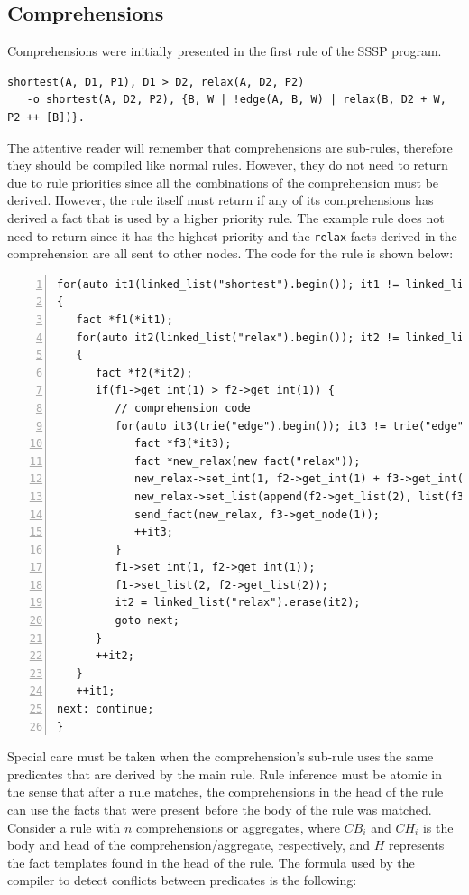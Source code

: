 \subsection{Comprehensions}

Comprehensions were initially presented in the first rule of the SSSP program.

\begin{Verbatim}[fontsize=\scriptsize]
shortest(A, D1, P1), D1 > D2, relax(A, D2, P2)
   -o shortest(A, D2, P2), {B, W | !edge(A, B, W) | relax(B, D2 + W, P2 ++ [B])}.
\end{Verbatim}

The attentive reader will remember that comprehensions are sub-rules, therefore
they should be compiled like normal rules. However, they do not need to return
due to rule priorities since all the combinations of the comprehension must be
derived. However, the rule itself must return if any of its comprehensions
has derived a fact that is used by a higher priority rule.
The example rule does not need to return since it has the highest priority and the
\texttt{relax} facts derived in the comprehension are all sent to other nodes.
The code for the rule is shown below:

\begin{Verbatim}[numbers=left,fontsize=\scriptsize]
for(auto it1(linked_list("shortest").begin()); it1 != linked_list("shortest").end(); )
{
   fact *f1(*it1);
   for(auto it2(linked_list("relax").begin()); it2 != linked_list("relax").end(); )
   {
      fact *f2(*it2);
      if(f1->get_int(1) > f2->get_int(1)) {
         // comprehension code
         for(auto it3(trie("edge").begin()); it3 != trie("edge").end(); ) {
            fact *f3(*it3);
            fact *new_relax(new fact("relax"));
            new_relax->set_int(1, f2->get_int(1) + f3->get_int(2));
            new_relax->set_list(append(f2->get_list(2), list(f3->get_node(1))));
            send_fact(new_relax, f3->get_node(1));
            ++it3;
         }
         f1->set_int(1, f2->get_int(1));
         f1->set_list(2, f2->get_list(2));
         it2 = linked_list("relax").erase(it2);
         goto next;
      }
      ++it2;
   }
   ++it1;
next: continue;
}
\end{Verbatim}

Special care must be taken when the comprehension's sub-rule uses the same
predicates that are derived by the main rule.
Rule inference must be atomic in the sense that after a rule matches, the
comprehensions in the head of the rule can use the facts that were present
before the body of the rule was matched.
Consider a rule with $n$ comprehensions or aggregates, where $CB_i$ and $CH_i$
is the body and head of the comprehension/aggregate, respectively, and $H$
represents the fact templates found in the head of the rule.
The formula used by the compiler to detect conflicts between predicates is the
following:

